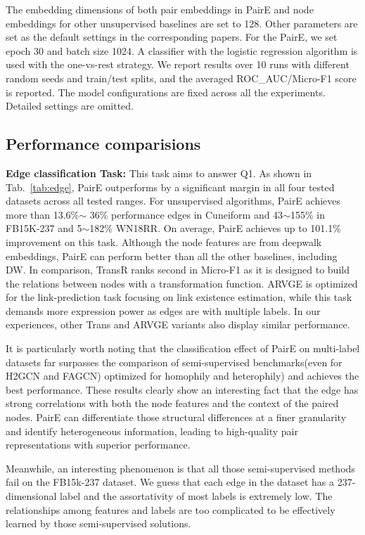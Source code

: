 \documentclass[10pt,journal,compsoc]{IEEEtran}
\begin{document}
The embedding dimensions of both pair embeddings in PairE and node embeddings for other unsupervised baselines are set to 128. Other parameters are set as the default settings in the corresponding papers. For the PairE, we set epoch 30 and batch size 1024. A classifier with the logistic regression algorithm is used with the one-vs-rest strategy. We report results over 10 runs with different random seeds and train/test splits, and the averaged ROC\_AUC/Micro-F1 score is reported. The model configurations are fixed across all the experiments. Detailed settings are omitted. 

\subsection{Performance comparisions}
\label{sec:results}
   
\noindent\textbf{Edge classification Task:} This task aims to answer Q1. As shown in Tab.~\ref{tab:edge}, PairE outperforms by a significant margin in all four tested datasets across all tested ranges. For unsupervised algorithms, PairE achieves more than 13.6\%$\sim$ 36\% performance edges in Cuneiform and 43$\sim$155\% in FB15K-237 and 5$\sim$182\% WN18RR. On average, PairE achieves up to 101.1\% improvement on this task. Although the node features are from deepwalk embeddings, PairE can perform better than all the other baselines, including DW.
In comparison, TransR ranks second in Micro-F1 as it is designed to build the relations between nodes with a transformation function. ARVGE is optimized for the link-prediction task focusing on link existence estimation, while this task demands more expression power as edges are with multiple labels. In our experiences, other Trans and ARVGE variants also display similar performance.

It is particularly worth noting that the classification effect of PairE on multi-label datasets far surpasses the comparison of semi-supervised benchmarks(even for H2GCN and FAGCN) optimized for homophily and heterophily) and achieves the best performance. 
These results clearly show an interesting fact that the edge has strong correlations with both the node features and the context of the paired nodes. PairE can differentiate those structural differences at a finer granularity and identify heterogeneous information, leading to high-quality pair representations with superior performance. 

Meanwhile, an interesting phenomenon is that all those semi-supervised methods fail on the FB15k-237 dataset. We guess that each edge in the dataset has a 237-dimensional label and the assortativity of most labels is extremely low. The relationships among features and labels are too complicated to be effectively learned by those semi-supervised solutions. 
\end{document}
